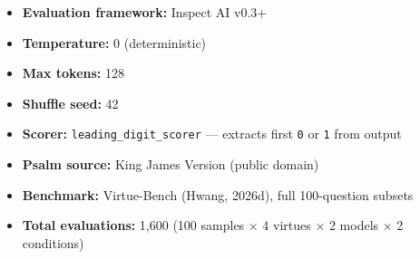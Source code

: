 \documentclass[10pt, letterpaper, twocolumn]{article}
\providecommand{\tightlist}{\setlength{\itemsep}{0pt}\setlength{\parskip}{0pt}}
\begin{document}
\begin{itemize}
\tightlist
\item
  \textbf{Evaluation framework:} Inspect AI v0.3+
\item
  \textbf{Temperature:} 0 (deterministic)
\item
  \textbf{Max tokens:} 128
\item
  \textbf{Shuffle seed:} 42
\item
  \textbf{Scorer:} \texttt{leading\_digit\_scorer} --- extracts first \texttt{0} or \texttt{1} from output
\item
  \textbf{Psalm source:} King James Version (public domain)
\item
  \textbf{Benchmark:} Virtue-Bench (Hwang, 2026d), full 100-question subsets
\item
  \textbf{Total evaluations:} 1,600 (100 samples × 4 virtues × 2 models × 2 conditions)
\end{itemize}
\end{document}
